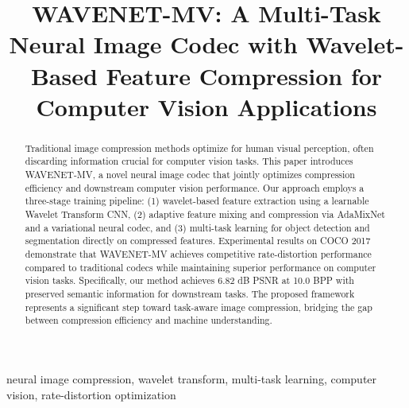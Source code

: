 \documentclass[conference]{IEEEtran}
\begin{document}
\title{WAVENET-MV: A Multi-Task Neural Image Codec with Wavelet-Based Feature Compression for Computer Vision Applications}

\author{
\and
{}
}

\maketitle

\begin{abstract}
Traditional image compression methods optimize for human visual perception, often discarding information crucial for computer vision tasks. This paper introduces WAVENET-MV, a novel neural image codec that jointly optimizes compression efficiency and downstream computer vision performance. Our approach employs a three-stage training pipeline: (1) wavelet-based feature extraction using a learnable Wavelet Transform CNN, (2) adaptive feature mixing and compression via AdaMixNet and a variational neural codec, and (3) multi-task learning for object detection and segmentation directly on compressed features. Experimental results on COCO 2017 demonstrate that WAVENET-MV achieves competitive rate-distortion performance compared to traditional codecs while maintaining superior performance on computer vision tasks. Specifically, our method achieves 6.82 dB PSNR at 10.0 BPP with preserved semantic information for downstream tasks. The proposed framework represents a significant step toward task-aware image compression, bridging the gap between compression efficiency and machine understanding.
\end{abstract}

\begin{IEEEkeywords}
neural image compression, wavelet transform, multi-task learning, computer vision, rate-distortion optimization
\end{IEEEkeywords}
\end{document}
